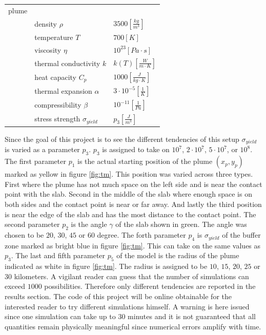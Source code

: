 \documentclass[12pt]{scrreprt}
\begin{document}
\begin{tabular}{lll}
plume&&\\
&density $\rho$&$3500 [\frac{kg}{m^3}]$\\
&temperature $T$&$700 [K]$\\
&viscosity $\eta$&$10^{23} [Pa\cdot s]$\\
&thermal conductivity $k$&$k(T) [\frac{W}{m\cdot K}]$\\
&heat capacity $C_p$&$1000 [\frac{J}{kg\cdot K}]$\\
&thermal expansion $\alpha$&$3\cdot10^{-5}[\frac{1}{K}]$\\
&compressibility $\beta$&$10^{-11}[\frac{1}{Pa}]$\\
&stress strength $\sigma_{yield}$&$p_3 [\frac{J}{m^3}]$ \\
\end{tabular}

Since the goal of this project is to see the different tendencies of this setup $\sigma_{yield}$ is varied as a parameter $p_3$. $p_3$ is assigned to take on $10^7$, $2\cdot 10^7$, $5\cdot 10^7$, or $10^8$. The first parameter $p_1$ is the actual starting position of the plume $(x_p,y_p)$ marked as yellow in figure \ref{fig:tm}. This position was varied across three types. First where the plume has not much space on the left side and is near the contact point with the slab. Second in the middle of the slab where enough space is on both sides and the contact point is near or far away. And lastly the third position is near the edge of the slab and has the most distance to the contact point.
The second parameter $p_2$ is the angle $\gamma$ of the slab shown in green. The angle was chosen to be $20$, $30$, $45$ or $60$ degree. The forth parameter $p_4$ is $\sigma_{yield}$ of the buffer zone marked as bright blue in figure \ref{fig:tm}. This can take on the same values as $p_3$. The last and fifth parameter $p_5$ of the model is the radius of the plume indicated as white in figure \ref{fig:tm}. The radius is assigned to be $10$, $15$, $20$, $25$ or $30$ kilometers. A vigilant reader can guess that the number of simulations can exceed $1000$ possibilities. Therefore only different tendencies are reported in the results section. The code of this project will be online obtainable for the interested reader to try different simulations himself. A warning is here issued since one simulation can take up to $30$ minutes and it is not guaranteed that all quantities remain physically meaningful since numerical errors amplify with time.
\end{document}
